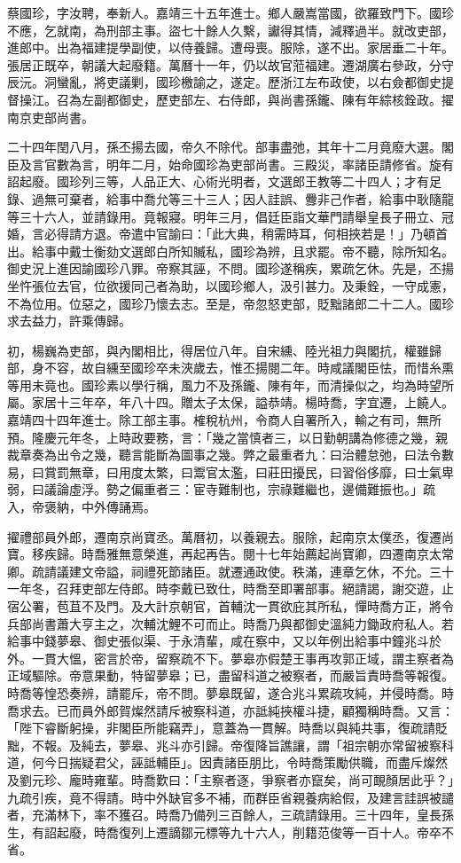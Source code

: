 \begin{pinyinscope}
蔡國珍，字汝聘，奉新人。嘉靖三十五年進士。鄉人嚴嵩當國，欲羅致門下。國珍不應，乞就南，為刑部主事。盜七十餘人久繫，讞得其情，減釋過半。就改吏部，進郎中。出為福建提學副使，以侍養歸。遭母喪。服除，遂不出。家居垂二十年。張居正既卒，朝議大起廢籍。萬曆十一年，仍以故官蒞福建。遷湖廣右參政，分守辰沅。洞蠻亂，將吏議剿，國珍檄諭之，遂定。歷浙江左布政使，以右僉都御史提督操江。召為左副都御史，歷吏部左、右侍郎，與尚書孫鑨、陳有年綜核銓政。擢南京吏部尚書。

二十四年閏八月，孫丕揚去國，帝久不除代。部事盡弛，其年十二月竟廢大選。閣臣及言官數為言，明年二月，始命國珍為吏部尚書。三殿災，率諸臣請修省。旋有詔起廢。國珍列三等，人品正大、心術光明者，文選郎王教等二十四人；才有足錄、過無可棄者，給事中喬允等三十三人；因人詿誤、釁非己作者，給事中耿隨龍等三十六人，並請錄用。竟報寢。明年三月，倡廷臣詣文華門請舉皇長子冊立、冠婚，言必得請方退。帝遣中官諭曰：「此大典，稍需時耳，何相挾若是！」乃頓首出。給事中戴士衡劾文選郎白所知贓私，國珍為辨，且求罷。帝不聽，除所知名。御史況上進因諭國珍八罪。帝察其誣，不問。國珍遂稱疾，累疏乞休。先是，丕揚坐忤張位去官，位欲援同己者為助，以國珍鄉人，汲引甚力。及秉銓，一守成憲，不為位用。位惡之，國珍乃懷去志。至是，帝忽怒吏部，貶黜諸郎二十二人。國珍求去益力，許乘傳歸。

初，楊巍為吏部，與內閣相比，得居位八年。自宋纁、陸光祖力與閣抗，權雖歸部，身不容，故自纁至國珍卒未浹歲去，惟丕揚閱二年。時咸議閣臣怯，而惜糸熏等用未竟也。國珍素以學行稱，風力不及孫鑨、陳有年，而清操似之，均為時望所屬。家居十三年卒，年八十四。贈太子太保，謚恭靖。楊時喬，字宜遷，上饒人。嘉靖四十四年進士。除工部主事。榷稅杭州，令商人自署所入，輸之有司，無所預。隆慶元年冬，上時政要務，言：「幾之當慎者三，以日勤朝講為修德之幾，親裁章奏為出令之幾，聽言能斷為圖事之幾。弊之最重者九：曰治體怠弛，曰法令數易，曰賞罰無章，曰用度太繁，曰鬻官太濫，曰莊田擾民，曰習俗侈靡，曰士氣卑弱，曰議論虛浮。勢之偏重者三：宦寺難制也，宗祿難繼也，邊備難振也。」疏入，帝褒納，中外傳誦焉。

擢禮部員外郎，遷南京尚寶丞。萬曆初，以養親去。服除，起南京太僕丞，復遷尚寶。移疾歸。時喬雅無意榮進，再起再告。閱十七年始薦起尚寶卿，四遷南京太常卿。疏請議建文帝謚，祠禮死節諸臣。就遷通政使。秩滿，連章乞休，不允。三十一年冬，召拜吏部左侍郎。時李戴已致仕，時喬至即署部事。絕請謁，謝交遊，止宿公署，苞苴不及門。及大計京朝官，首輔沈一貫欲庇其所私，憚時喬方正，將令兵部尚書蕭大亨主之，次輔沈鯉不可而止。時喬乃與都御史溫純力鋤政府私人。若給事中錢夢皋、御史張似渠、于永清輩，咸在察中，又以年例出給事中鐘兆斗於外。一貫大慍，密言於帝，留察疏不下。夢皋亦假楚王事再攻郭正域，謂主察者為正域驅除。帝意果動，特留夢皋；已，盡留科道之被察者，而嚴旨責時喬等報復。時喬等惶恐奏辨，請罷斥，帝不問。夢皋既留，遂合兆斗累疏攻純，并侵時喬。時喬求去。已而員外郎賀燦然請斥被察科道，亦詆純挾權斗捷，顧獨稱時喬。又言：「陛下睿斷躬操，非閣臣所能竊弄」，意蓋為一貫解。時喬以與純共事，復疏請貶黜，不報。及純去，夢皋、兆斗亦引歸。帝復降旨譙讓，謂「祖宗朝亦常留被察科道，何今日揣疑君父，誣詆輔臣」。因責諸臣朋比，令時喬策勵供職，而盡斥燦然及劉元珍、龐時雍輩。時喬歎曰：「主察者逐，爭察者亦竄矣，尚可靦顏居此乎？」九疏引疾，竟不得請。時中外缺官多不補，而群臣省親養病給假，及建言詿誤被譴者，充滿林下，率不獲召。時喬乃備列三百餘人，三疏請錄用。三十四年，皇長孫生，有詔起廢，時喬復列上遷謫鄒元標等九十六人，削籍范俊等一百十人。帝卒不省。


\end{pinyinscope}
